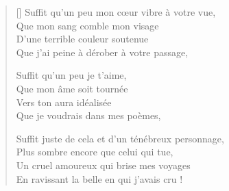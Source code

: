 \settowidth{\versewidth}{Suffit juste de cela et d'un ténébreux personnage,}
\begin{verse}[\versewidth]
Suffit qu'un peu mon cœur vibre à votre vue, \\
Que mon sang comble mon visage \\
D'une terrible couleur soutenue \\
Que j'ai peine à dérober à votre passage,

Suffit qu'un peu je t'aime, \\
Que mon âme soit tournée \\
Vers ton aura idéalisée \\
Que je voudrais dans mes poèmes,

Suffit juste de cela et d'un ténébreux personnage, \\
Plus sombre encore que celui qui tue, \\
Un cruel amoureux qui brise mes voyages \\
En ravissant la belle en qui j'avais cru !
\end{verse}






